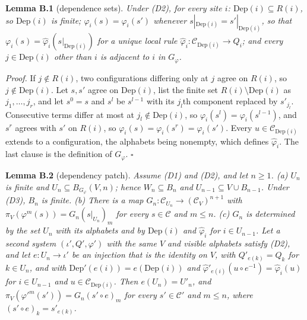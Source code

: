 \documentclass[
]{article}
\begin{document}
\textbf{Lemma B.1} (dependence sets). \emph{Under (D2), for every site
\(i\): \(\mathrm{Dep}(i) \subseteq R(i)\), so \(\mathrm{Dep}(i)\) is
finite; \(\varphi_i(s) = \varphi_i(s')\) whenever
\(s|_{\mathrm{Dep}(i)} = s'|_{\mathrm{Dep}(i)}\), so that
\(\varphi_i(s) = \hat\varphi_i(s|_{\mathrm{Dep}(i)})\) for a unique
local rule \(\hat\varphi_i : \mathcal{C}_{\mathrm{Dep}(i)} \to Q_i\);
and every \(j \in \mathrm{Dep}(i)\) other than \(i\) is adjacent to
\(i\) in \(G_\varphi\).}

\emph{Proof.} If \(j \notin R(i)\), two configurations differing only at
\(j\) agree on \(R(i)\), so \(j \notin \mathrm{Dep}(i)\). Let \(s, s'\)
agree on \(\mathrm{Dep}(i)\), list the finite set
\(R(i) \setminus \mathrm{Dep}(i)\) as \(j_1, \ldots, j_r\), and let
\(s^0 = s\) and \(s^l\) be \(s^{l-1}\) with its \(j_l\)th component
replaced by \(s'_{j_l}\). Consecutive terms differ at most at
\(j_l \notin \mathrm{Dep}(i)\), so
\(\varphi_i(s^l) = \varphi_i(s^{l-1})\), and \(s^r\) agrees with \(s'\)
on \(R(i)\), so \(\varphi_i(s) = \varphi_i(s^r) = \varphi_i(s')\). Every
\(u \in \mathcal{C}_{\mathrm{Dep}(i)}\) extends to a configuration, the
alphabets being nonempty, which defines \(\hat\varphi_i\). The last
clause is the definition of \(G_\varphi\). \(\square\)

\textbf{Lemma B.2} (dependency patch). \emph{Assume (D1) and (D2), and
let \(n \geq 1\). (a) \(U_n\) is finite and
\(U_n \subseteq B_{G_\varphi}(V, n)\); hence \(W_n \subseteq B_n\) and
\(U_{n-1} \subseteq V \cup B_{n-1}\). Under (D3), \(B_n\) is finite. (b)
There is a map \(G_n : \mathcal{C}_{U_n} \to (\mathcal{C}_V)^{n+1}\)
with \(\pi_V(\varphi^m(s)) = G_n(s|_{U_n})_m\) for every
\(s \in \mathcal{C}\) and \(m \leq n\). (c) \(G_n\) is determined by the
set \(U_n\) with its alphabets and by \(\mathrm{Dep}(i)\) and
\(\hat\varphi_i\) for \(i \in U_{n-1}\). Let a second system
\((\iota', Q', \varphi')\) with the same \(V\) and visible alphabets
satisfy (D2), and let \(e : U_n \to \iota'\) be an injection that is the
identity on \(V\), with \(Q'_{e(k)} = Q_k\) for \(k \in U_n\), and with
\(\mathrm{Dep}'(e(i)) = e(\mathrm{Dep}(i))\) and
\(\hat\varphi'_{e(i)}(u \circ e^{-1}) = \hat\varphi_i(u)\) for
\(i \in U_{n-1}\) and \(u \in \mathcal{C}_{\mathrm{Dep}(i)}\). Then
\(e(U_n) = U'_n\), and \(\pi_V(\varphi'^m(s')) = G_n(s' \circ e)_m\) for
every \(s' \in \mathcal{C}'\) and \(m \leq n\), where
\((s' \circ e)_k = s'_{e(k)}\).}
\end{document}
